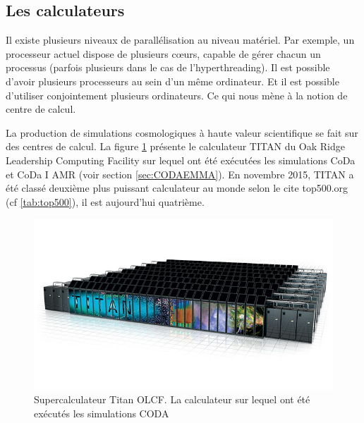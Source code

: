 \subsection{Les calculateurs}
\label{sec:titan}

Il existe plusieurs niveaux de parallélisation au niveau matériel.
Par exemple, un processeur actuel dispose de plusieurs cœurs, capable de gérer chacun un processus (parfois plusieurs dans le cas de l'hyperthreading).
Il est possible d'avoir plusieurs processeurs au sein d'un même ordinateur.
Et il est possible d'utiliser conjointement plusieurs ordinateurs.
Ce qui nous mène à la notion de centre de calcul.

La production de simulations cosmologiques à haute valeur scientifique se fait sur des centres de calcul.
La figure \ref{fig:titan} présente le calculateur TITAN du Oak Ridge Leadership Computing Facility sur lequel ont été exécutées les simulations CoDa \citep{ocvirk_cosmic_2015} et CoDa I AMR (voir section \ref{sec:CODAEMMA}).
En novembre 2015, TITAN a été classé deuxième plus puissant calculateur au monde selon le cite top500.org (cf \ref{tab:top500}), il est aujourd'hui quatrième.

\begin{figure}
        \includegraphics[width=.95\linewidth]{img/02/titan.jpg} 
        \caption[Titan]{Supercalculateur Titan OLCF.
        La calculateur sur lequel ont été exécutés les simulations CODA}
 		\label{fig:titan}
\end{figure}

